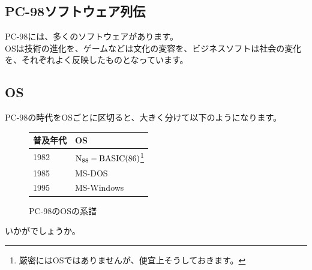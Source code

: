\documentclass[b5paper,9pt,platex,dvipdfmx]{jsarticle}
\begin{document}
\begin{multicols}{3}
\section[short]{PC-98ソフトウェア列伝}
PC-98には、多くのソフトウェアがあります。\\
OSは技術の進化を、ゲームなどは文化の変容を、ビジネスソフトは社会の変化を、それぞれよく反映したものとなっています。\\
\subsection[short]{OS}
PC-98の時代をOSごとに区切ると、大きく分けて以下のようになります。\\
\begin{figure}[H]
  \centering
  \begin{tabular}{ll}
    普及年代 & OS\\ \hline
    1982 & $\rm{N_{88}-BASIC (86)}$\footnote{厳密にはOSではありませんが、便宜上そうしておきます。}\\
    1985 & MS-DOS\\
    1995 & MS-Windows\\
  \end{tabular}
  \caption{PC-98のOSの系譜}
\end{figure}
  いかがでしょうか。\\

\end{multicols}
\end{document}
